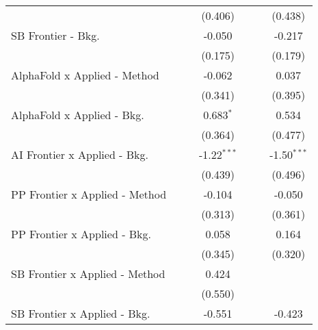 \begin{tabular}{lcccccc}
                                  &              &              & (0.406)       &             &              & (0.438)\\   
   SB Frontier - Bkg.             &              &              & -0.050        &             &              & -0.217\\   
                                  &              &              & (0.175)       &             &              & (0.179)\\   
   AlphaFold x Applied - Method   &              &              & -0.062        &             &              & 0.037\\   
                                  &              &              & (0.341)       &             &              & (0.395)\\   
   AlphaFold x Applied - Bkg.     &              &              & 0.683$^{*}$   &             &              & 0.534\\   
                                  &              &              & (0.364)       &             &              & (0.477)\\   
   AI Frontier x Applied - Bkg.   &              &              & -1.22$^{***}$ &             &              & -1.50$^{***}$\\   
                                  &              &              & (0.439)       &             &              & (0.496)\\   
   PP Frontier x Applied - Method &              &              & -0.104        &             &              & -0.050\\   
                                  &              &              & (0.313)       &             &              & (0.361)\\   
   PP Frontier x Applied - Bkg.   &              &              & 0.058         &             &              & 0.164\\   
                                  &              &              & (0.345)       &             &              & (0.320)\\   
   SB Frontier x Applied - Method &              &              & 0.424         &             &              &   \\   
                                  &              &              & (0.550)       &             &              &   \\   
   SB Frontier x Applied - Bkg.   &              &              & -0.551        &             &              & -0.423\\   

\end{tabular}
